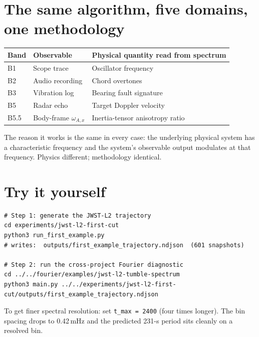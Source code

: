 \documentclass[11pt,a4paper,openany]{book}
\begin{document}
\section{The same algorithm, five domains, one methodology}

\medskip
\begin{longtable}{p{1.5cm}p{3.0cm}p{9.0cm}}
\toprule
\textbf{Band} & \textbf{Observable} & \textbf{Physical quantity read from spectrum} \\
\midrule
\endhead
B1 & Scope trace & Oscillator frequency \\
B2 & Audio recording & Chord overtones \\
B3 & Vibration log & Bearing fault signature \\
B5 & Radar echo & Target Doppler velocity \\
B5.5 & Body-frame $\omega_{A,x}$ & Inertia-tensor anisotropy ratio \\
\bottomrule
\end{longtable}
\medskip

The reason it works is the same in every case: the underlying physical system
has a characteristic frequency and the system's observable output modulates at
that frequency. Physics different; methodology identical.

\section{Try it yourself}

\begin{lstlisting}[style=shaddata]
# Step 1: generate the JWST-L2 trajectory
cd experiments/jwst-l2-first-cut
python3 run_first_example.py
# writes:  outputs/first_example_trajectory.ndjson  (601 snapshots)

# Step 2: run the cross-project Fourier diagnostic
cd ../../fourier/examples/jwst-l2-tumble-spectrum
python3 main.py ../../experiments/jwst-l2-first-cut/outputs/first_example_trajectory.ndjson
\end{lstlisting}

To get finer spectral resolution: set \texttt{t\_max = 2400} (four times
longer). The bin spacing drops to 0.42\,mHz and the predicted 231-s period
sits cleanly on a resolved bin.

\setcounter{chapter}{5}
\renewcommand{\thechapter}{\arabic{chapter}}
\end{document}
